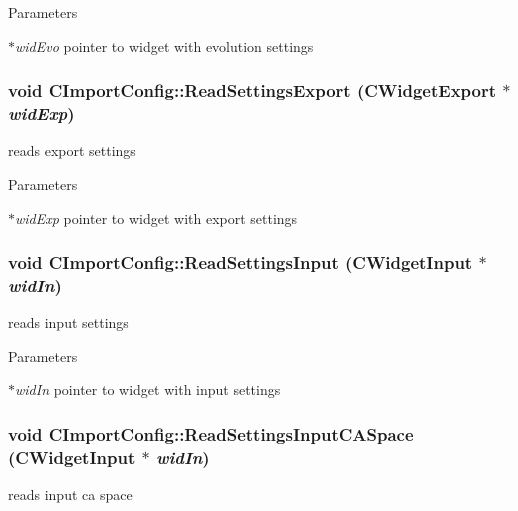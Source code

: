 \begin{DoxyParams}{Parameters}
\item[{\em $\ast$widEvo}]pointer to widget with evolution settings \end{DoxyParams}
\hypertarget{classCImportConfig_adeba1887e4095c43cc3ea4ada724a75a}{
\subsubsection[{ReadSettingsExport}]{\setlength{\rightskip}{0pt plus 5cm}void CImportConfig::ReadSettingsExport ({\bf CWidgetExport} $\ast$ {\em widExp})}}
\label{classCImportConfig_adeba1887e4095c43cc3ea4ada724a75a}
reads export settings


\begin{DoxyParams}{Parameters}
\item[{\em $\ast$widExp}]pointer to widget with export settings \end{DoxyParams}
\hypertarget{classCImportConfig_ab1d9c03db12994e62f95195f7a280bb9}{
\subsubsection[{ReadSettingsInput}]{\setlength{\rightskip}{0pt plus 5cm}void CImportConfig::ReadSettingsInput ({\bf CWidgetInput} $\ast$ {\em widIn})}}
\label{classCImportConfig_ab1d9c03db12994e62f95195f7a280bb9}
reads input settings


\begin{DoxyParams}{Parameters}
\item[{\em $\ast$widIn}]pointer to widget with input settings \end{DoxyParams}
\hypertarget{classCImportConfig_a90f26f48dd036015d6dbe9ca70c255df}{
\subsubsection[{ReadSettingsInputCASpace}]{\setlength{\rightskip}{0pt plus 5cm}void CImportConfig::ReadSettingsInputCASpace ({\bf CWidgetInput} $\ast$ {\em widIn})}}
\label{classCImportConfig_a90f26f48dd036015d6dbe9ca70c255df}
reads input ca space


